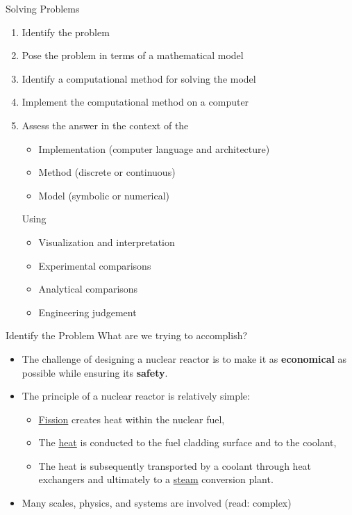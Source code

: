 \documentclass[xcolor=x11names,compress, handout]{beamer}
\renewcommand{\(}{\begin{columns}}
\renewcommand{\)}{\end{columns}}
\newcommand{\<}[1]{\begin{column}{#1}}
\renewcommand{\>}{\end{column}}
\begin{document}
\begin{frame}{Solving Problems}
\begin{enumerate}
\item Identify the problem
\item Pose the problem in terms of a mathematical model
\item Identify a computational method for solving the model
\item Implement the computational method on a computer
\item Assess the answer in the context of the
\begin{itemize}
\item Implementation (computer language and architecture)
\item Method (discrete or continuous)
\item Model (symbolic or numerical)
\end{itemize}
Using
\begin{itemize}
\item Visualization and interpretation
\item Experimental comparisons
\item Analytical comparisons
\item Engineering judgement
\end{itemize}
\end{enumerate}
\end{frame}


\begin{frame}{Identify the Problem}
What are we trying to accomplish?
\begin{itemize}
\item The challenge of designing a nuclear reactor is to make it as \textbf{economical} as possible while ensuring its \textbf{safety}. \vspace*{1 em}

\pause
\item The principle of a nuclear reactor is relatively simple:
\begin{itemize}
\item \underline{Fission} creates heat within the nuclear fuel,
\item The \underline{heat} is conducted to the fuel cladding surface and to the coolant,
\item The heat is subsequently transported by a coolant through heat exchangers and ultimately to a \underline{steam} conversion plant.
\end{itemize}
\vspace*{1 em}

\pause
\item Many scales, physics, and systems are involved (read: complex)
\end{itemize}
\end{frame}
\end{document}
